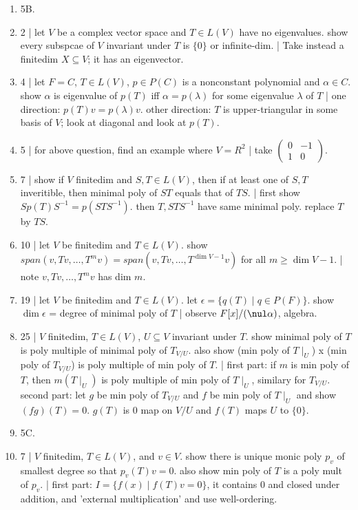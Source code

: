 \begin{enumerate}
	\item 5B. 
	\item 2 | let $V$ be a complex vector space and $T \in L(V)$ have no eigenvalues. show every subspcae of $V$ invariant under $T$ is $\{0\}$ or infinite-dim. | Take instead a finitedim $X \subseteq V$; it has an eigenvector. 
	\item 4 | let $F=C$, $T \in L(V)$, $p \in P(C)$ is a nonconstant polynomial and $\alpha \in C$. show $\alpha$ is eigenvalue of $p(T)$ iff $\alpha = p(\lambda)$ for some eigenvalue $\lambda$ of $T$ | one direction: $p(T)v = p(\lambda)v$. other direction: $T$ is upper-triangular in some basis of $V$; look at diagonal and look at $p(T)$. 
	\item 5 | for above question, find an example where $V = R^2$ | take $\begin{pmatrix} 0 & -1 \\ 1 & 0 \end{pmatrix}$. 
	\item 7 | show if $V$ finitedim and $S,T \in L(V)$, then if at least one of $S,T$ inveritible, then minimal poly of $ST$ equals that of $TS$. | first show $Sp(T)S^{-1} = p(STS^{-1})$. then $T,STS^{-1}$ have same minimal poly. replace $T$ by $TS$. 
	\item 10 | let $V$ be finitedim and $T \in L(V)$. show $span(v,Tv,\dots,T^m v)=span(v,Tv,\dots,T^{\dim V - 1}v)$ for all $m \geq \dim V - 1$. | note $v,Tv,\dots,T^{m}v$ has dim $m$. 
	\item 19 | let $V$ be finitedim and $T \in L(V)$. let $\epsilon = \{q(T) \mid q \in P(F)\}$. show $\dim \epsilon$ = degree of minimal poly of $T$ | observe $F[x] / (\nul \alpha)$, algebra. 
	\item 25 | $V$ finitedim, $T \in L(V)$, $U \subseteq V$ invariant under $T$. show minimal poly of $T$ is poly multiple of minimal poly of $T_{V/U}$. also show (min poly of $T \mid_U$) x (min poly of $T_{V/U}$) is poly multiple of min poly of $T$. | first part: if $m$ is min poly of $T$, then $m(T \mid_U)$ is poly multiple of min poly of $T \mid_U$, similary for $T_{V/U}$. second part: let $g$ be min poly of $T_{V/U}$ and $f$ be min poly of $T \mid_U$ and show $(fg)(T)=0$. $g(T)$ is 0 map on $V/U$ and $f(T)$ maps $U$ to $\{0\}$. 
	\item 5C. 
	\item 7 | $V$ finitedim, $T \in L(V)$, and $v \in V$. show there is unique monic poly $p_v$ of smallest degree so that $p_v(T)v=0$. also show min poly of $T$ is a poly mult of $p_v$. | first part: $I = \{f(x) \mid f(T)v=0\}$, it contains 0 and closed under addition, and 'external multiplication' and use well-ordering. 

\end{enumerate}
